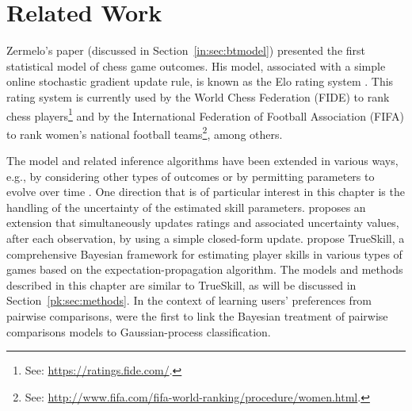 \section{Related Work}
\label{pk:sec:relwork}

Zermelo's \citeyear{zermelo1928berechnung} paper (discussed in Section~\ref{in:sec:btmodel}) presented the first statistical model of chess game outcomes.
His model, associated with a simple online stochastic gradient update rule, is known as the Elo rating system \citep{elo1978rating}.
This rating system is currently used by the World Chess Federation (FIDE) to rank chess players\footnote{See: \url{https://ratings.fide.com/}.} and by the International Federation of Football Association (FIFA) to rank women's national football teams\footnote{See: \url{http://www.fifa.com/fifa-world-ranking/procedure/women.html}.}, among others.

The model and related inference algorithms have been extended in various ways, e.g., by considering other types of outcomes \citep{rao1967ties, maher1982modelling} or by permitting parameters to evolve over time \citep{glickman1993paired, fahrmeir1994dynamic, cattelan2013dynamic}.
One direction that is of particular interest in this chapter is the handling of the uncertainty of the estimated skill parameters.
\citet{glickman1999parameter} proposes an extension that simultaneously updates ratings and associated uncertainty values, after each observation, by using a simple closed-form update.
\citet{herbrich2006trueskill} propose TrueSkill, a comprehensive Bayesian framework for estimating player skills in various types of games based on the expectation-propagation algorithm.
The models and methods described in this chapter are similar to TrueSkill, as will be discussed in Section~\ref{pk:sec:methods}.
In the context of learning users' preferences from pairwise comparisons, \citet{chu2005preference} were the first to link the Bayesian treatment of pairwise comparisons models to Gaussian-process classification.
